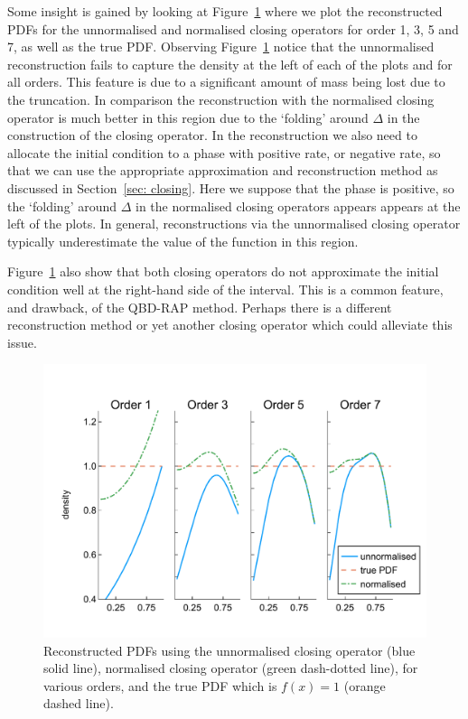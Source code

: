 Some insight is gained by looking at Figure~\ref{fig: pdf reconstructed} where we plot the reconstructed PDFs for the unnormalised and normalised closing operators for order 1, 3, 5 and 7, as well as the true PDF. Observing Figure~\ref{fig: pdf reconstructed} notice that the unnormalised reconstruction fails to capture the density at the left of each of the plots and for all orders. This feature is due to a significant amount of mass being lost due to the truncation. In comparison the reconstruction with the normalised closing operator is much better in this region due to the `folding' around \(\Delta\) in the construction of the closing operator. In the reconstruction we also need to allocate the initial condition to a phase with positive rate, or negative rate, so that we can use the appropriate approximation and reconstruction method as discussed in Section~\ref{sec: closing}. Here we suppose that the phase is positive, so the `folding' around \(\Delta\) in the normalised closing operators appears appears at the left of the plots. In general, reconstructions via the unnormalised closing operator typically underestimate the value of the function in this region. 

Figure~\ref{fig: pdf reconstructed} also show that both closing operators do not approximate the initial condition well at the right-hand side of the interval. This is a common feature, and drawback, of the QBD-RAP method. Perhaps there is a different reconstruction method or yet another closing operator which could alleviate this issue. 
\begin{figure}
	\centering
	\includegraphics[width=\textwidth]{chapter5/figs/qbdrap_closing_vec/fun4/pdfs_formatted.pdf}
	\caption{Reconstructed PDFs using the unnormalised closing operator (blue solid line), normalised closing operator (green dash-dotted line), for various orders, and the true PDF which is \(f(x)=1\) (orange dashed line).}
	\label{fig: pdf reconstructed}
\end{figure} 


